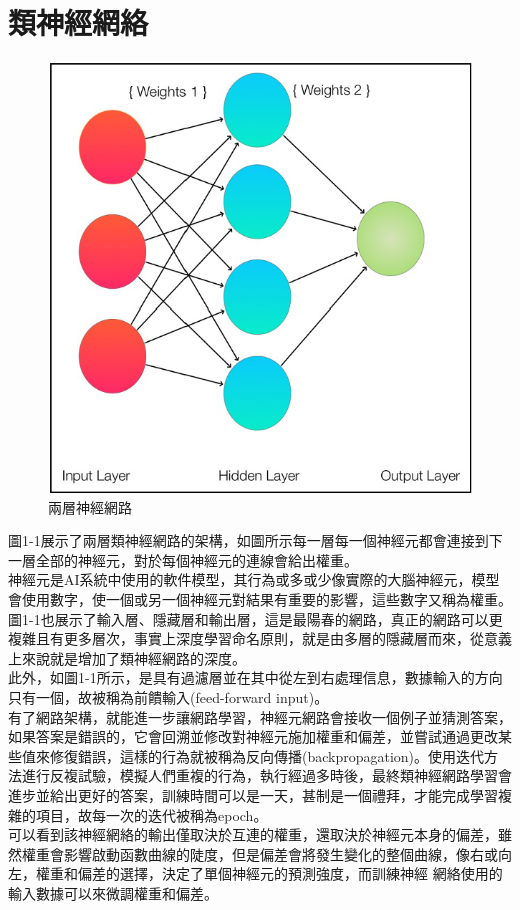 \documentclass[14pt,a4paper]{report}  %
\begin{document}
\section{類神經網絡}
\begin{figure}[hbt!]
\begin{center}
\includegraphics[scale=0.74]{兩層神經網路}
\caption{兩層神經網路}
\end{center}
\end{figure}
\qquad 圖1-1展示了兩層類神經網路的架構，如圖所示每一層每一個神經元都會連接到下一層全部的神經元，對於每個神經元的連線會給出權重。\\
\qquad 神經元是AI系統中使用的軟件模型，其行為或多或少像實際的大腦神經元，模型會使用數字，使一個或另一個神經元對結果有重要的影響，這些數字又稱為權重。\\
\qquad 圖1-1也展示了輸入層、隱藏層和輸出層，這是最陽春的網路，真正的網路可以更複雜且有更多層次，事實上深度學習命名原則，就是由多層的隱藏層而來，從意義上來說就是增加了類神經網路的深度。\\
\qquad 此外，如圖1-1所示，是具有過濾層並在​​其中從左到右處理信息，數據輸入的方向只有一個，故被稱為前饋輸入(feed-forward input)。\\
\qquad 有了網路架構，就能進一步讓網路學習，神經元網路會接收一個例子並猜測答案，如果答案是錯誤的，它會回溯並修改對神經元施加權重和偏差，並嘗試通過更改某些值來修復錯誤，這樣的行為就被稱為反向傳播(backpropagation)。使用迭代方法進行反複試驗，模擬人們重複的行為，執行經過多時後，最終類神經網路學習會進步並給出更好的答案，訓練時間可以是一天，甚制是一個禮拜，才能完成學習複雜的項目，故每一次的迭代被稱為epoch。\\
\qquad 可以看到該神經網絡的輸出僅取決於互連的權重，還取決於神經元本身的偏差，雖然權重會影響啟動函數曲線的陡度，但是偏差會將發生變化的整個曲線，像右或向左，權重和偏差的選擇，決定了單個神經元的預測強度，而訓練神經
網絡使用的輸入數據可以來微調權重和偏差。
\end{document}
